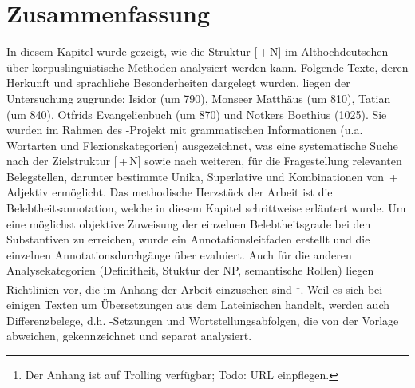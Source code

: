 \section{Zusammenfassung}

In diesem Kapitel wurde gezeigt, wie die Struktur [\,+\,N] im Althochdeutschen über korpuslinguistische Methoden analysiert werden kann. Folgende Texte, deren Herkunft und sprachliche Besonderheiten dargelegt wurden, liegen der Untersuchung zugrunde: Isidor (um 790), Monseer Matthäus (um 810), Tatian (um 840), Otfrids Evangelienbuch (um 870) und Notkers Boethius (1025). Sie wurden im Rahmen des -Projekt mit grammatischen Informationen (u.a. Wortarten und Flexionskategorien) ausgezeichnet, was eine systematische Suche nach der Zielstruktur [\,+\,N] sowie nach weiteren, für die Fragestellung relevanten Belegstellen, darunter bestimmte Unika, Superlative und Kombinationen von \,+\,Adjektiv ermöglicht. Das methodische Herzstück der Arbeit ist die Belebtheitsannotation, welche in diesem Kapitel schrittweise erläutert wurde. Um eine möglichst objektive Zuweisung der einzelnen Belebtheitsgrade bei den Substantiven zu erreichen, wurde ein Annotationsleitfaden erstellt und die einzelnen Annotationsdurchgänge über  evaluiert. Auch für die anderen Analysekategorien (Definitheit, Stuktur der NP, semantische Rollen) liegen Richtlinien vor, die im Anhang der Arbeit einzusehen sind \footnote{Der Anhang ist auf Trolling verfügbar; Todo: URL einpflegen.}. Weil es sich bei einigen Texten um Übersetzungen aus dem Lateinischen handelt, werden auch Differenzbelege, d.h. -Setzungen  und Wortstellungsabfolgen, die von der Vorlage abweichen, gekennzeichnet und separat analysiert. 
  
